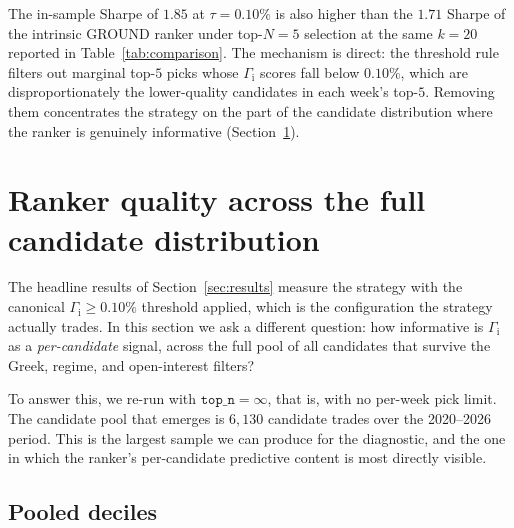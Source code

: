 \documentclass[11pt]{article}
\theoremstyle{definition}
\theoremstyle{remark}
\newcommand{\GROUND}{\Gamma_{\mathrm{i}}}
\begin{document}
The in-sample Sharpe of $1.85$ at $\tau = 0.10\%$ is also higher
than the $1.71$ Sharpe of the intrinsic GROUND ranker under top-$N = 5$
selection at the same $k = 20$ reported in Table~\ref{tab:comparison}. The mechanism is
direct: the threshold rule filters out marginal top-$5$ picks
whose $\GROUND$ scores fall below $0.10\%$, which are
disproportionately the lower-quality candidates in each week's
top-$5$. Removing them concentrates the strategy on the part of
the candidate distribution where the ranker is genuinely
informative (Section~\ref{sec:decile}).


\section{Ranker quality across the full candidate distribution}\label{sec:decile}

The headline results of Section~\ref{sec:results} measure the
strategy with the canonical $\GROUND \geq 0.10\%$ threshold
applied, which is the configuration the strategy actually trades.
In this section we ask a different question: how informative is
$\GROUND$ as a \emph{per-candidate} signal, across the full pool
of all candidates that survive the Greek, regime, and
open-interest filters?

To answer this, we re-run with $\texttt{top\_n} = \infty$, that
is, with no per-week pick limit. The candidate pool that emerges is
$6{,}130$ candidate trades over the 2020--2026 period. This is the
largest sample we can produce for the diagnostic, and the one in
which the ranker's per-candidate predictive content is most
directly visible.

\subsection{Pooled deciles}
\end{document}
